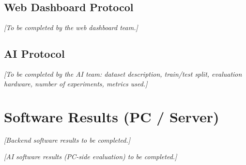 \subsection{Web Dashboard Protocol}
\begin{center}
	\textit{[To be completed by the web dashboard team.]}
\end{center}

\subsection{AI Protocol}
\begin{center}
	\textit{[To be completed by the AI team: dataset description, train/test split,
				evaluation hardware, number of experiments, metrics used.]}
\end{center}

\section{Software Results (PC / Server)}

\begin{center}
	\textit{[Backend software results to be completed.]}
\end{center}

\begin{center}
	\textit{[AI software results (PC-side evaluation) to be completed.]}
\end{center}

